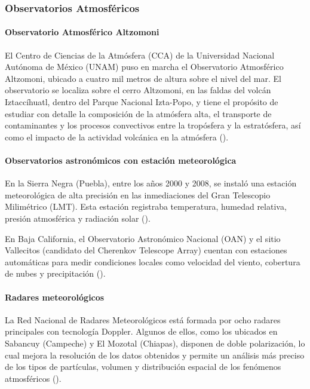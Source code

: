 \subsubsection*{Observatorios Atmosféricos}

\paragraph{Observatorio Atmosférico Altzomoni}

El Centro de Ciencias de la Atmósfera (CCA) de la Universidad Nacional Autónoma de México (UNAM) puso en marcha el Observatorio Atmosférico Altzomoni, ubicado a cuatro mil metros de altura sobre el nivel del mar. El observatorio se localiza sobre el cerro Altzomoni, en las faldas del volcán Iztaccíhuatl, dentro del Parque Nacional Izta-Popo, y tiene el propósito de estudiar con detalle la composición de la atmósfera alta, el transporte de contaminantes y los procesos convectivos entre la tropósfera y la estratósfera, así como el impacto de la actividad volcánica en la atmósfera  (\cite{sedema2025}).

\paragraph{Observatorios astronómicos con estación meteorológica}

En la Sierra Negra (Puebla), entre los años 2000 y 2008, se instaló una estación meteorológica de alta precisión en las inmediaciones del Gran Telescopio Milimétrico (LMT). Esta estación registraba temperatura, humedad relativa, presión atmosférica y radiación solar  (\cite{granicus2009}).

En Baja California, el Observatorio Astronómico Nacional (OAN) y el sitio Vallecitos (candidato del Cherenkov Telescope Array) cuentan con estaciones automáticas para medir condiciones locales como velocidad del viento, cobertura de nubes y precipitación (\cite{garcia2020, vallecitos2016}).

\paragraph{Radares meteorológicos}

La Red Nacional de Radares Meteorológicos está formada por ocho radares principales con tecnología Doppler. Algunos de ellos, como los ubicados en Sabancuy (Campeche) y El Mozotal (Chiapas), disponen de doble polarización, lo cual mejora la resolución de los datos obtenidos y permite un análisis más preciso de los tipos de partículas, volumen y distribución espacial de los fenómenos atmosféricos (\cite{smn_radar65_2025}).

